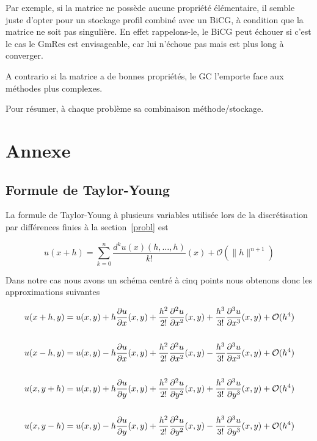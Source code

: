 \documentclass[twoside,12pt]{report}
\theoremstyle{remark}
\begin{document}
Par exemple, si la matrice ne possède aucune propriété élémentaire, il semble juste d'opter pour un stockage profil combiné avec un BiCG, à condition que la matrice ne soit pas singulière. En effet rappelons-le, le BiCG peut échouer si c'est le cas le GmRes est envisageable, car lui n'échoue pas mais est plus long à converger.

A contrario si la matrice a de bonnes propriétés, le GC l'emporte face aux méthodes plus complexes.

Pour résumer, à chaque problème sa combinaison méthode/stockage.

\chapter{Annexe}

\section{Formule de Taylor-Young}
\label{taylor}

La formule de Taylor-Young à plusieurs variables utilisée lors de la discrétisation par différences finies à la section~\ref{probl} est

\begin{equation*}
u(x+h)=\sum \limits_{k=0}^n \frac{d^k u(x)(h,\ldots,h)}{k!}(x)+\mathcal{O}(\| h\|^{n+1})
\end{equation*}

Dans notre cas nous avons un schéma centré à cinq points nous obtenons donc les approximations suivantes

\begin{align*}
u(x+h,y)=u(x,y)+h\dfrac{\partial u}{\partial x}(x,y)+\dfrac{h^2}{2!}\dfrac{\partial^{2}u}{\partial x^2}(x,y)+\dfrac{h^3}{3!}\dfrac{\partial^{3}u}{\partial x^3}(x,y)+\mathcal{O}(h^4) \\
\vspace{3cm} \\
u(x-h,y)=u(x,y)-h\frac{\partial u}{\partial x}(x,y)+\frac{h^2}{2!}\frac{\partial^{2}u}{\partial x^2}(x,y)-\frac{h^3}{3!}\frac{\partial^{3}u}{\partial x^3}(x,y)+\mathcal{O}(h^4) \\
\vspace{3cm} \\
u(x,y+h)=u(x,y)+h\frac{\partial u}{\partial y}(x,y)+\frac{h^2}{2!}\frac{\partial^{2}u}{\partial y^2}(x,y)+\frac{h^3}{3!}\frac{\partial^{3}u}{\partial y^3}(x,y)+\mathcal{O}(h^4) \\
\vspace{3cm} \\
u(x,y-h)=u(x,y)-h\frac{\partial u}{\partial y}(x,y)+\frac{h^2}{2!}\frac{\partial^{2}u}{\partial y^2}(x,y)-\frac{h^3}{3!}\frac{\partial^{3}u}{\partial y^3}(x,y)+\mathcal{O}(h^4) 
\end{align*}
\end{document}
